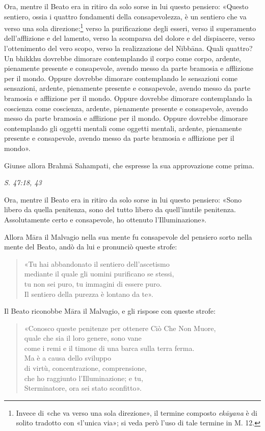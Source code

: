 Ora, mentre il Beato era in ritiro da solo sorse in lui questo pensiero:
«Questo sentiero, ossia i quattro fondamenti della consapevolezza, è un
sentiero che va verso una sola direzione:\footnote{Invece di «che va verso una sola direzione», il termine composto \emph{ekāyana} è di solito tradotto con «l’unica via»; si veda però l’uso di tale termine in M. 12.} verso la
purificazione degli esseri, verso il superamento dell’afflizione e del
lamento, verso la scomparsa del dolore e del dispiacere, verso
l’ottenimento del vero scopo, verso la realizzazione del Nibbāna. Quali
quattro? Un bhikkhu dovrebbe dimorare contemplando il corpo come corpo,
ardente, pienamente presente e consapevole, avendo messo da parte
bramosia e afflizione per il mondo. Oppure dovrebbe dimorare
contemplando le sensazioni come sensazioni, ardente, pienamente presente
e consapevole, avendo messo da parte bramosia e afflizione per il mondo.
Oppure dovrebbe dimorare contemplando la coscienza come coscienza,
ardente, pienamente presente e consapevole, avendo messo da parte
bramosia e afflizione per il mondo. Oppure dovrebbe dimorare
contemplando gli oggetti mentali come oggetti mentali, ardente,
pienamente presente e consapevole, avendo messo da parte bramosia e
afflizione per il mondo».


Giunse allora Brahmā Sahampati, che espresse la sua approvazione come
prima.


\emph{S. 47:18, 43}


Ora, mentre il Beato era in ritiro da solo sorse in lui questo pensiero:
«Sono libero da quella penitenza, sono del tutto libero da quell’inutile
penitenza. Assolutamente certo e consapevole, ho ottenuto
l’Illuminazione».


Allora Māra il Malvagio nella sua mente fu consapevole del pensiero
sorto nella mente del Beato, andò da lui e pronunciò queste strofe:


\begin{quote}
«Tu hai abbandonato il sentiero dell’ascetismo \\
mediante il quale gli uomini purificano se stessi, \\
tu non sei puro, tu immagini di essere puro. \\
Il sentiero della purezza è lontano da te».
\end{quote}

Il Beato riconobbe Māra il Malvagio, e gli rispose con queste strofe:


\begin{quote}
«Conosco queste penitenze per ottenere Ciò Che Non Muore, \\
quale che sia il loro genere, sono vane \\
come i remi e il timone di una barca sulla terra ferma. \\
Ma è a causa dello sviluppo \\
di virtù, concentrazione, comprensione, \\
che ho raggiunto l’Illuminazione; e tu, \\
Sterminatore, ora sei stato sconfitto».
\end{quote}

